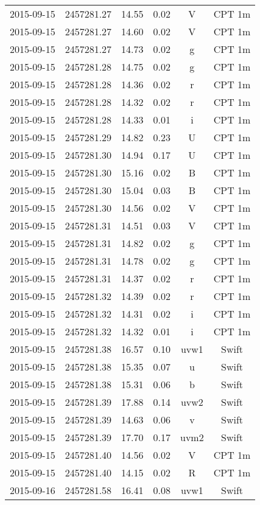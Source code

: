 \begin{table}
\begin{tabular}{cccccc}
2015-09-15 & 2457281.27 & 14.55 & 0.02 & V & CPT 1m \\
2015-09-15 & 2457281.27 & 14.60 & 0.02 & V & CPT 1m \\
2015-09-15 & 2457281.27 & 14.73 & 0.02 & g & CPT 1m \\
2015-09-15 & 2457281.28 & 14.75 & 0.02 & g & CPT 1m \\
2015-09-15 & 2457281.28 & 14.36 & 0.02 & r & CPT 1m \\
2015-09-15 & 2457281.28 & 14.32 & 0.02 & r & CPT 1m \\
2015-09-15 & 2457281.28 & 14.33 & 0.01 & i & CPT 1m \\
2015-09-15 & 2457281.29 & 14.82 & 0.23 & U & CPT 1m \\
2015-09-15 & 2457281.30 & 14.94 & 0.17 & U & CPT 1m \\
2015-09-15 & 2457281.30 & 15.16 & 0.02 & B & CPT 1m \\
2015-09-15 & 2457281.30 & 15.04 & 0.03 & B & CPT 1m \\
2015-09-15 & 2457281.30 & 14.56 & 0.02 & V & CPT 1m \\
2015-09-15 & 2457281.31 & 14.51 & 0.03 & V & CPT 1m \\
2015-09-15 & 2457281.31 & 14.82 & 0.02 & g & CPT 1m \\
2015-09-15 & 2457281.31 & 14.78 & 0.02 & g & CPT 1m \\
2015-09-15 & 2457281.31 & 14.37 & 0.02 & r & CPT 1m \\
2015-09-15 & 2457281.32 & 14.39 & 0.02 & r & CPT 1m \\
2015-09-15 & 2457281.32 & 14.31 & 0.02 & i & CPT 1m \\
2015-09-15 & 2457281.32 & 14.32 & 0.01 & i & CPT 1m \\
2015-09-15 & 2457281.38 & 16.57 & 0.10 & uvw1 & Swift \\
2015-09-15 & 2457281.38 & 15.35 & 0.07 & u & Swift \\
2015-09-15 & 2457281.38 & 15.31 & 0.06 & b & Swift \\
2015-09-15 & 2457281.39 & 17.88 & 0.14 & uvw2 & Swift \\
2015-09-15 & 2457281.39 & 14.63 & 0.06 & v & Swift \\
2015-09-15 & 2457281.39 & 17.70 & 0.17 & uvm2 & Swift \\
2015-09-15 & 2457281.40 & 14.56 & 0.02 & V & CPT 1m \\
2015-09-15 & 2457281.40 & 14.15 & 0.02 & R & CPT 1m \\
2015-09-16 & 2457281.58 & 16.41 & 0.08 & uvw1 & Swift \\

\end{tabular}
\end{table}
